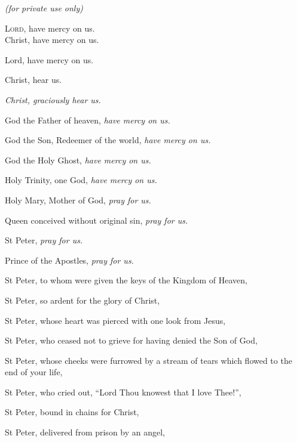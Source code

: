 
\newHymn


   \makebox[0cm][l]{%
                 \bfseries \huge\upnums{\thehymnNo}}%
   \centerline{ \itshape (for private use only)} \vskip-5pt







\lettrine{L}{ord,} have mercy on us.\\
Christ, have mercy on us.

\begin{hangparas}{1em}{1}
\parskip0mm

Lord, have mercy on us.

Christ, hear us.

{\itshape Christ, graciously hear us.}

God the Father of heaven, {\itshape have mercy on us.}

God the Son, Redeemer of the world, {\itshape have mercy on us.}

God the Holy Ghost, {\itshape have mercy on us.}

Holy Trinity, one God, {\itshape have mercy on us.}

Holy Mary, Mother of God, \textit{pray for us.}

Queen conceived without original sin, \textit{pray for us.}


St Peter, \textit{pray for us.}

Prince of the Apostles, \textit{pray for us.}

St Peter, to whom were given the keys of the Kingdom of Heaven, 

St Peter, so ardent for the glory of Christ,

St Peter, whose heart was pierced with one look from Jesus,	

St Peter, who ceased not to grieve for having denied the Son of God,

St Peter, whose cheeks were furrowed by a stream of tears which flowed
to the end of your life,

St Peter, who cried out, ``Lord Thou knowest that I love Thee!'',

St Peter, bound in chains for Christ,

St Peter, delivered from prison by an angel,


\end{hangparas}
